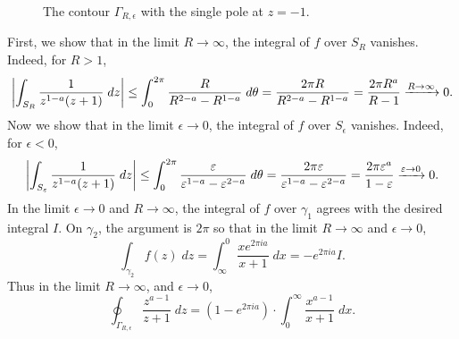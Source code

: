 \documentclass{article}
\begin{document}
	\begin{figure}[h!]
		\centering
		\caption{The contour $\Gamma_{R, \epsilon}$ with the single pole at $z =-1$.}
		\label{fig:2019JI2}
	\end{figure}
	First, we show that in the limit $R \to \infty$, the integral of $f$ over $S_{R}$ vanishes. Indeed, for $R > 1$, 
	\begin{align*}
		\begin{split}
			\left| \int_{S_{R}}\frac{1}{z^{1 - a}(z + 1)}\;dz \right| \leq \int_{0}^{2\pi}\frac{R}{R^{2 - a} - R^{1 - a}}\;d\theta = \frac{2\pi R}{R^{2 - a} - R^{1 - a}} = \frac{2\pi R^{a}}{R - 1} \xrightarrow{R \to \infty} 0.
		\end{split}
	\end{align*}
	Now we show that in the limit $\epsilon \to 0$, the integral of $f$ over $S_{\epsilon}$ vanishes. Indeed, for $\epsilon < 0$, 
	\begin{equation*}
		\left| \int_{S_{\varepsilon}}\frac{1}{z^{1 - a}(z + 1)}\;dz \right| \leq \int_{0}^{2\pi}\frac{\varepsilon}{\varepsilon^{1 - a} - \varepsilon^{2 - a}}\;d\theta = \frac{2\pi \varepsilon}{\varepsilon^{1 - a} - \varepsilon^{2 - a}} = \frac{2\pi \varepsilon^{a}}{1 - \varepsilon} \xrightarrow{\varepsilon \to 0} 0.
	\end{equation*}
	In the limit $\epsilon \to 0$ and $R \to \infty$, the integral of $f$ over $\gamma_{1}$ agrees with the desired integral $I$. On $\gamma_{2}$, the argument is $2\pi$ so that in the limit $R \to \infty$ and $\epsilon \to 0$,
	\begin{equation*}
		\int_{\gamma_{2}}f(z)\;dz = \int_{\infty}^{0}\frac{xe^{2\pi i a}}{x + 1}\;dx = -e^{2\pi ia}I. 
	\end{equation*}
	Thus in the limit $R \to \infty$, and $\epsilon \to0$, 
	\begin{equation*}
		\oint_{\Gamma_{R,\epsilon}}\frac{z^{a-1}}{z + 1}\;dz = (1 - e^{2\pi i a}) \cdot \int_{0}^{\infty}\frac{x^{a-1}}{x + 1}\;dx.
	\end{equation*}
\end{document}
